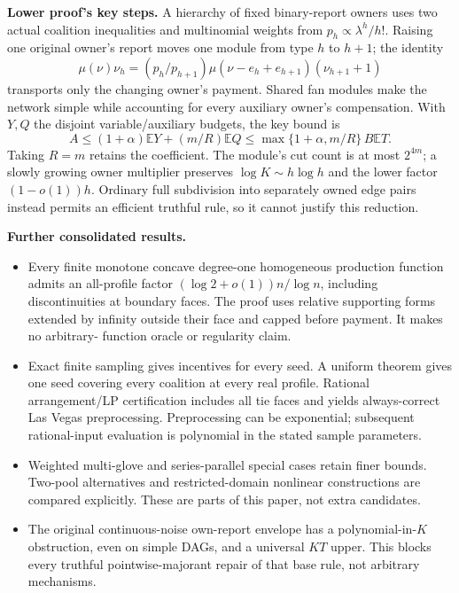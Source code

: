 \documentclass[11pt]{article}
\begin{document}
\newpage
\textbf{Lower proof's key steps.} A hierarchy of fixed binary-report owners
uses two actual coalition inequalities and multinomial weights from
$p_h\propto\lambda^h/h!$. Raising one original owner's report moves one
module from type $h$ to $h+1$; the identity
\[
 \mu(\nu)\nu_h=(p_h/p_{h+1})\mu(\nu-e_h+e_{h+1})(\nu_{h+1}+1)
\]
transports only the changing owner's payment. Shared fan modules make the
network simple while accounting for every auxiliary owner's compensation.
With $Y,Q$ the disjoint variable/auxiliary budgets, the key bound is
\[
 A\le(1+\alpha)\mathbb EY+(m/R)\mathbb EQ
   \le\max\{1+\alpha,m/R\}\,B\mathbb ET.
\]
Taking $R=m$ retains the coefficient. The module's cut count is at most
$2^{4m}$; a slowly growing owner multiplier preserves
$\log K\sim h\log h$ and the lower factor $(1-o(1))h$.
Ordinary full subdivision into separately owned edge pairs instead permits
an efficient truthful rule, so it cannot justify this reduction.

\textbf{Further consolidated results.}
\begin{itemize}
\item Every finite monotone concave degree-one homogeneous production function
admits an all-profile factor $(\log2+o(1))n/\log n$, including discontinuities
at boundary faces. The proof uses relative supporting forms extended by
infinity outside their face and capped before payment. It makes no arbitrary-
function oracle or regularity claim.
\item Exact finite sampling gives incentives for every seed. A uniform theorem
gives one seed covering every coalition at every real profile. Rational
arrangement/LP certification includes all tie faces and yields always-correct
Las Vegas preprocessing. Preprocessing can be exponential; subsequent
rational-input evaluation is polynomial in the stated sample parameters.
\item Weighted multi-glove and series-parallel special cases retain finer
bounds. Two-pool alternatives and restricted-domain nonlinear constructions
are compared explicitly. These are parts of this paper, not extra candidates.
\item The original continuous-noise own-report envelope has a polynomial-in-$K$
obstruction, even on simple DAGs, and a universal $KT$ upper. This blocks every
truthful pointwise-majorant repair of that base rule, not arbitrary mechanisms.
\end{itemize}
\end{document}
